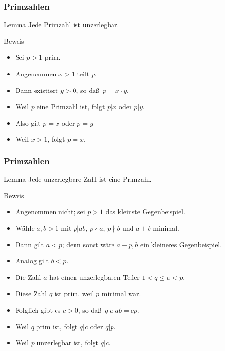 \documentclass{beamer}
\renewcommand{\ae}{\"a}
\begin{document}
\begin{frame}\frametitle{Primzahlen}
	\begin{block}{Lemma}
		Jede Primzahl ist unzerlegbar.
	\end{block}
	\begin{block}{Beweis}
		\begin{itemize}
			\item Sei $p>1$ prim.
			\item Angenommen $x>1$ teilt $p$.
			\item Dann existiert $y>0$, so da\ss\ $p=x\cdot y$.
			\item Weil $p$ eine Primzahl ist, folgt $p|x$ oder $p|y$.
			\item Also gilt $p=x$ oder $p=y$.
			\item Weil $x>1$, folgt $p=x$.
		\end{itemize}
	\end{block}
\end{frame}

\begin{frame}\frametitle{Primzahlen}
	\begin{block}{Lemma}
		Jede unzerlegbare Zahl ist eine Primzahl.
	\end{block}
	\begin{block}{Beweis}
		\begin{itemize}
			\item Angenommen nicht; sei $p>1$ das kleinste Gegenbeispiel.
			\item W\ae hle $a,b>1$ mit $p|ab$, $p\nmid a$, $p\nmid b$ und $a+b$ minimal.
			\item Dann gilt $a<p$; denn sonst w\ae re $a-p,b$ ein kleineres Gegenbeispiel.
			\item Analog gilt $b<p$.
			\item Die Zahl $a$ hat einen unzerlegbaren Teiler $1<q\leq a<p$.
			\item Diese Zahl $q$ ist prim, weil $p$ minimal war.
			\item Folglich gibt es $c>0$, so da\ss\ $q|a|ab=cp$.
			\item Weil $q$ prim ist, folgt $q|c$ oder $q|p$.
			\item Weil $p$ unzerlegbar ist, folgt $q|c$.
		\end{itemize}
	\end{block}
\end{frame}
\end{document}
